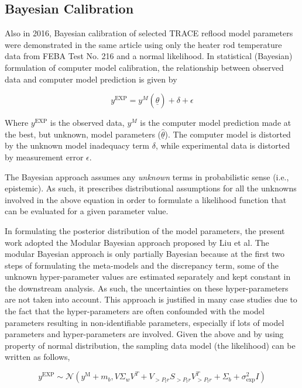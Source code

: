 \documentclass[11pt,titlepage]{article}
\begin{document}
\subsection{Bayesian Calibration}

Also in 2016, Bayesian calibration of selected TRACE reflood model parameters
were demonstrated in the same article \cite{Wicaksono2016} using only the heater 
rod temperature data from FEBA Test No. 216 and a normal likelihood. 
In statistical (Bayesian) formulation of computer model calibration, 
the relationship between observed data and computer model prediction is 
given by

\begin{equation}
	y^{\text{EXP}} = y^M (\underline{\hat{\theta}})+ \delta + \epsilon
\end{equation}

Where $y^\text{EXP}$ is the observed data, $y^M$  is the computer model 
prediction made at the best, but unknown, model parameters 
($\underline{\hat{\theta}}$). The computer model is distorted by the 
unknown model inadequacy term $\delta$, while experimental data is 
distorted by measurement error $\epsilon$.

The Bayesian approach assumes any \emph{unknown} terms in probabilistic 
sense (i.e., epistemic). 
As such, it prescribes distributional assumptions for all the unknowns 
involved in the above equation in order to formulate a likelihood function 
that can be evaluated for a given parameter value.

In formulating the posterior distribution of the model parameters, 
the present work adopted the Modular Bayesian approach proposed 
by Liu et al. 
The modular Bayesian approach is only partially Bayesian because 
at the first two steps of formulating the meta-models and the discrepancy 
term, some of the unknown hyper-parameter values are estimated separately 
and kept constant in the downstream analysis. 
As such, the uncertainties on these hyper-parameters are not taken into 
account. 
This approach is justified in many case studies due to the fact that the 
hyper-parameters are often confounded with the model parameters resulting 
in non-identifiable parameters, especially if lots of model parameters 
and hyper-parameters are involved. 
Given the above and by using property of normal distribution, 
the sampling data model (the likelihood) can be written as follows,

\begin{equation}
    y^{\text{EXP}} \sim \mathcal{N}(y^\text{M} + m_b, V \Sigma_w V^T + V_{>P_tr} S_{>P_tr} V_{>P_tr}^T + \Sigma_b + \sigma_\text{exp}^2 I)
\end{equation}
\end{document}

